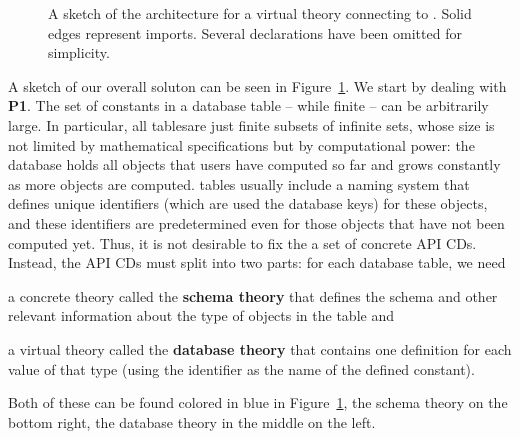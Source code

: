 \begin{figure}[ht]
{
    }
    \endgroup
  \caption[Virtual Theory Architecture]{
    A sketch of the architecture for a virtual theory connecting to \lmfdb. 
    Solid edges represent imports. 
    Several declarations have been omitted for simplicity. 
  }
  \label{fig:vtarch}
\end{figure}
A sketch of our overall soluton can be seen in Figure~\ref{fig:vtarch}. 
We start by dealing with \textbf{P1}. 
The set of constants in a database table -- while finite -- can be arbitrarily large.
In particular, all \lmfdb tables\footnotemark are just finite subsets of infinite sets, whose size is not limited by mathematical specifications but by computational power: the database holds all objects that users have computed so far and grows constantly as more objects are computed.
\lmfdb tables usually include a naming system that defines unique identifiers (which are used the database keys) for these objects, and these identifiers are predetermined even for those objects that have not been computed yet.
Thus, it is not desirable to fix the a set of concrete API CDs.
Instead, the API CDs must split into two parts: for each database table, we need
\begin{compactitem}
  \item a concrete theory called the \textbf{schema theory} that defines the schema  and other relevant information about the type of objects in the table and
  \item a virtual theory called the \textbf{database theory} that contains one definition for each value of that type (using the \lmfdb identifier as the name of the defined constant). 
\end{compactitem}
Both of these can be found colored in blue in Figure~\ref{fig:vtarch}, the schema theory on the bottom right, the database theory in the middle on the left. 

